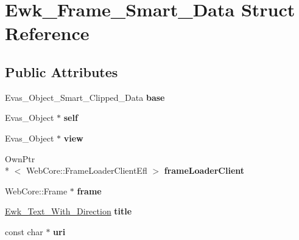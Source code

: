 \hypertarget{structEwk__Frame__Smart__Data}{\section{Ewk\+\_\+\+Frame\+\_\+\+Smart\+\_\+\+Data Struct Reference}
\label{structEwk__Frame__Smart__Data}
}
\subsection*{Public Attributes}
\begin{DoxyCompactItemize}
\item 
\hypertarget{structEwk__Frame__Smart__Data_a93825131c1a6d5d20f36d599286d0e41}{Evas\+\_\+\+Object\+\_\+\+Smart\+\_\+\+Clipped\+\_\+\+Data {\bfseries base}}\label{structEwk__Frame__Smart__Data_a93825131c1a6d5d20f36d599286d0e41}

\item 
\hypertarget{structEwk__Frame__Smart__Data_a7bf7561653274f7e1e6658a3058def95}{Evas\+\_\+\+Object $\ast$ {\bfseries self}}\label{structEwk__Frame__Smart__Data_a7bf7561653274f7e1e6658a3058def95}

\item 
\hypertarget{structEwk__Frame__Smart__Data_a55acb02ae6915a7d9690f1e888886039}{Evas\+\_\+\+Object $\ast$ {\bfseries view}}\label{structEwk__Frame__Smart__Data_a55acb02ae6915a7d9690f1e888886039}

\item 
\hypertarget{structEwk__Frame__Smart__Data_a5610061464ef5edf37fab65e1840d962}{Own\+Ptr\\*
$<$ Web\+Core\+::\+Frame\+Loader\+Client\+Efl $>$ {\bfseries frame\+Loader\+Client}}\label{structEwk__Frame__Smart__Data_a5610061464ef5edf37fab65e1840d962}

\item 
\hypertarget{structEwk__Frame__Smart__Data_a188947c39c5930807dff45da6cb84a26}{Web\+Core\+::\+Frame $\ast$ {\bfseries frame}}\label{structEwk__Frame__Smart__Data_a188947c39c5930807dff45da6cb84a26}

\item 
\hypertarget{structEwk__Frame__Smart__Data_a123179739e53de9732797b7f52760cc5}{\hyperlink{ewk__frame_8h_a462349df6b57692977314cb4eea36d7c}{Ewk\+\_\+\+Text\+\_\+\+With\+\_\+\+Direction} {\bfseries title}}\label{structEwk__Frame__Smart__Data_a123179739e53de9732797b7f52760cc5}

\item 
\hypertarget{structEwk__Frame__Smart__Data_a55f74b7faeba6ca4cd6a70441df0b260}{const char $\ast$ {\bfseries uri}}\label{structEwk__Frame__Smart__Data_a55f74b7faeba6ca4cd6a70441df0b260}


\end{DoxyCompactItemize}
